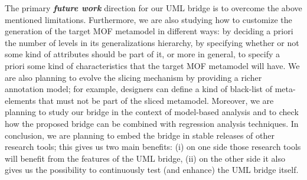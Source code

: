 The primary \textbf{\textit{future work}} direction for our UML bridge is to overcome the above mentioned limitations.
Furthermore, we are also studying how to customize the generation of the target MOF metamodel in different ways: by deciding a priori the number of levels in its generalizations hierarchy, by specifying whether or not some kind of attributes should be part of it, or more in general, to specify a priori some kind of characteristics that the target MOF metamodel will have.
We are also planning to evolve the slicing mechanism by providing a richer annotation model; for example,
designers can define a kind of black-list of meta-elements that must not be part of the sliced metamodel.
Moreover, we are planning to study our bridge in the context of model-based analysis and to check
how the proposed bridge can be combined with regression analysis techniques.
In conclusion, we are planning to embed the bridge in stable releases of other research tools; this gives us two main benefits:
(i) on one side those research tools will benefit from the features of the UML bridge,
(ii) on the other side it also gives us the possibility to continuously test (and enhance) the UML bridge itself.


